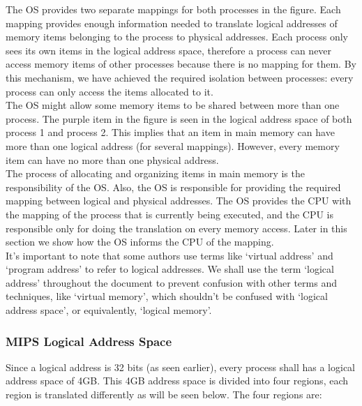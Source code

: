 \documentclass[]{scrartcl}
\begin{document}
The OS provides two separate mappings for both processes in the figure.
Each mapping provides enough information needed to translate
logical addresses of memory items belonging to the process to
physical addresses. Each process only sees its own items in the
logical address space, therefore a process can never access
memory items of other processes because there is no mapping for them.
By this mechanism, we have achieved the required isolation between 
processes: every process can only access the items allocated to it.\\

The OS might allow some memory items to be shared between more
than one process. The purple item in the figure is seen in the
logical address space of both process 1 and process 2. This implies
that an item in main memory can have more than one logical address (for
several mappings). However, every memory item can have no more than
one physical address.\\

The process of allocating and organizing items in main memory is the
responsibility of the OS. Also, the OS is responsible for providing
the required mapping between logical and physical addresses. The OS
provides the CPU with the mapping of the process that is currently
being executed, and the CPU is responsible only for doing the translation
on every memory access. Later in this section we show how the OS
informs the CPU of the mapping. \\

It's important to note that some authors use terms like
`virtual address' and `program address' to refer to logical addresses. 
We shall use the term `logical address' throughout the document to 
prevent confusion with other terms and techniques, like `virtual memory', 
which shouldn't be confused with `logical address space', or equivalently,
`logical memory'.\\

\subsubsection{MIPS Logical Address Space}

Since a logical address is 32 bits (as seen earlier), every process
shall has a logical address space of 4GB. This 4GB address space
is divided into four regions, each region is translated differently
as will be seen below. The four regions are:
\end{document}
